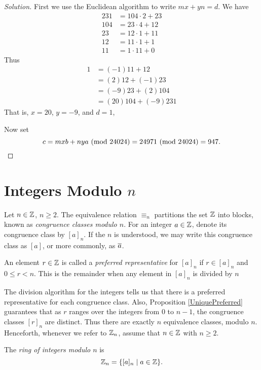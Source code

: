 \documentclass{amsart}
\begin{document}
\begin{proof}[Solution]
First we use the Euclidean algorithm to write $mx + yn = d$.
We have
\begin{align*}
231 &= 104 \cdot 2 + 23 \\
104 &= 23 \cdot 4 + 12 \\
23 &= 12 \cdot 1 + 11 \\
12 &= 11 \cdot 1 + 1 \\
11 &= 1 \cdot 11 + 0
\end{align*}
Thus
\begin{align*}
1 &= (-1) 11 + 12 \\
  &= (2) 12 + (-1) 23 \\
  &= (-9) 23 + (2) 104 \\
  &= (20) 104 + (-9) 231
\end{align*}
That is, $x = 20$, $y = -9$, and $d = 1$,

Now set
\[ c = mxb + nya \text{\rm{ (mod }}{24024}\text{\rm{)}} = 24971 \text{\rm{ (mod }}{24024}\text{\rm{)}} = 947. \]
\end{proof}

\newpage

\section{Integers Modulo $n$}

Let $n \in \mathbb{Z}$, $n \ge 2$.
The equivalence relation $\equiv_{n}$ partitions the set $\mathbb{Z}$
into blocks, known as {\em congruence classes modulo $n$}.
For an integer $a \in \mathbb{Z}$, denote its
congruence class by $[a]_{n}$.
If the $n$ is understood, we may write this congruence class as $[a]$,
or more commonly, as $\overline{a}$.

An element $r \in \mathbb{Z}$ is called a {\em preferred representative}
for $[a]_{n}$ if $r \in [a]_{n}$ and $0 \le r < n$.  This is the remainder
when any element in $[a]_n$ is divided by $n$

The division algorithm for the integers tells us that there is a
preferred representative for each congruence class. Also, Proposition \ref{UniquePreferred}
guarantees that as
$r$ ranges over the integers from $0$ to $n-1$, the congruence
classes $[r]_{n}$ are distinct.  Thus there are exactly $n$
equivalence classes, modulo $n$.  Henceforth, whenever we refer to $\mathbb{Z}_n$,
assume that $n \in \mathbb{Z}$ with $n \ge 2$.

\begin{Def}
The {\em ring of integers modulo $n$}
is
\[ \mathbb{Z}_n = \{ [a]_n \mid a \in \mathbb{Z} \}. \]
\end{Def}
\end{document}
